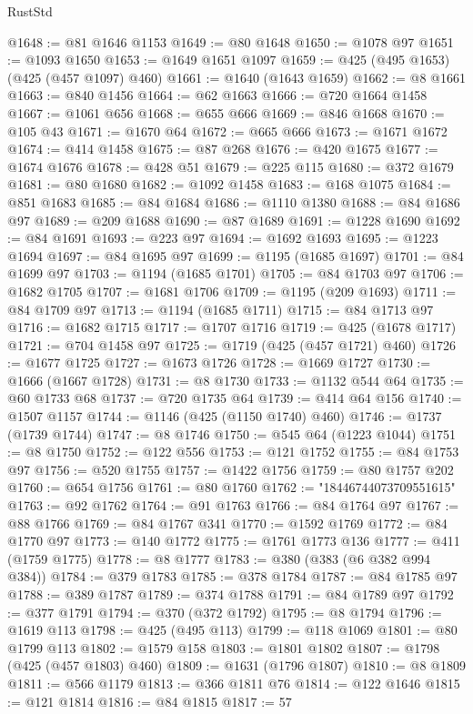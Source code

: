 \begin{lexlean}{RustStd}
\begin{coremodule}
@1648 := @81 @1646 @1153
@1649 := @80 @1648
@1650 := @1078 @97
@1651 := @1093 @1650
@1653 := @1649 @1651 @1097
@1659 := @425 (@495 @1653) (@425 (@457 @1097) @460)
@1661 := @1640 (@1643 @1659)
@1662 := @8 @1661
@1663 := @840 @1456
@1664 := @62 @1663
@1666 := @720 @1664 @1458
@1667 := @1061 @656
@1668 := @655 @666
@1669 := @846 @1668
@1670 := @105 @43
@1671 := @1670 @64
@1672 := @665 @666
@1673 := @1671 @1672
@1674 := @414 @1458
@1675 := @87 @268
@1676 := @420 @1675
@1677 := @1674 @1676
@1678 := @428 @51
@1679 := @225 @115
@1680 := @372 @1679
@1681 := @80 @1680
@1682 := @1092 @1458
@1683 := @168 @1075
@1684 := @851 @1683
@1685 := @84 @1684
@1686 := @1110 @1380
@1688 := @84 @1686 @97
@1689 := @209 @1688
@1690 := @87 @1689
@1691 := @1228 @1690
@1692 := @84 @1691
@1693 := @223 @97
@1694 := @1692 @1693
@1695 := @1223 @1694
@1697 := @84 @1695 @97
@1699 := @1195 (@1685 @1697)
@1701 := @84 @1699 @97
@1703 := @1194 (@1685 @1701)
@1705 := @84 @1703 @97
@1706 := @1682 @1705
@1707 := @1681 @1706
@1709 := @1195 (@209 @1693)
@1711 := @84 @1709 @97
@1713 := @1194 (@1685 @1711)
@1715 := @84 @1713 @97
@1716 := @1682 @1715
@1717 := @1707 @1716
@1719 := @425 (@1678 @1717)
@1721 := @704 @1458 @97
@1725 := @1719 (@425 (@457 @1721) @460)
@1726 := @1677 @1725
@1727 := @1673 @1726
@1728 := @1669 @1727
@1730 := @1666 (@1667 @1728)
@1731 := @8 @1730
@1733 := @1132 @544 @64
@1735 := @60 @1733 @68
@1737 := @720 @1735 @64
@1739 := @414 @64 @156
@1740 := @1507 @1157
@1744 := @1146 (@425 (@1150 @1740) @460)
@1746 := @1737 (@1739 @1744)
@1747 := @8 @1746
@1750 := @545 @64 (@1223 @1044)
@1751 := @8 @1750
@1752 := @122 @556
@1753 := @121 @1752
@1755 := @84 @1753 @97
@1756 := @520 @1755
@1757 := @1422 @1756
@1759 := @80 @1757 @202
@1760 := @654 @1756
@1761 := @80 @1760
@1762 := "18446744073709551615"
@1763 := @92 @1762
@1764 := @91 @1763
@1766 := @84 @1764 @97
@1767 := @88 @1766
@1769 := @84 @1767 @341
@1770 := @1592 @1769
@1772 := @84 @1770 @97
@1773 := @140 @1772
@1775 := @1761 @1773 @136
@1777 := @411 (@1759 @1775)
@1778 := @8 @1777
@1783 := @380 (@383 (@6 @382 @994 @384))
@1784 := @379 @1783
@1785 := @378 @1784
@1787 := @84 @1785 @97
@1788 := @389 @1787
@1789 := @374 @1788
@1791 := @84 @1789 @97
@1792 := @377 @1791
@1794 := @370 (@372 @1792)
@1795 := @8 @1794
@1796 := @1619 @113
@1798 := @425 (@495 @113)
@1799 := @118 @1069
@1801 := @80 @1799 @113
@1802 := @1579 @158
@1803 := @1801 @1802
@1807 := @1798 (@425 (@457 @1803) @460)
@1809 := @1631 (@1796 @1807)
@1810 := @8 @1809
@1811 := @566 @1179
@1813 := @366 @1811 @76
@1814 := @122 @1646
@1815 := @121 @1814
@1816 := @84 @1815
@1817 := 57

\end{coremodule}
\end{lexlean}
